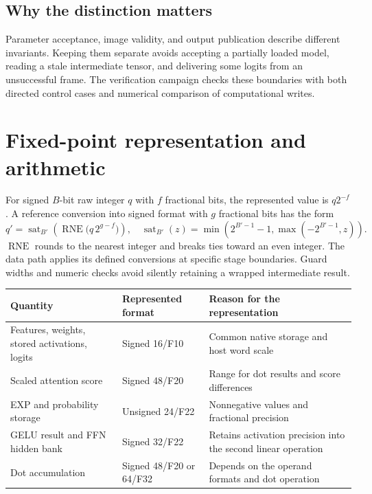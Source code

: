 \subsection{Why the distinction matters}
Parameter acceptance, image validity, and output publication describe different invariants. Keeping them separate avoids accepting a partially loaded model, reading a stale intermediate tensor, and delivering some logits from an unsuccessful frame. The verification campaign checks these boundaries with both directed control cases and numerical comparison of computational writes.
\clearpage

\section{Fixed-point representation and arithmetic}
For signed \(B\)-bit raw integer \(q\) with \(f\) fractional bits, the represented value is \(q2^{-f}\). A reference conversion into signed format with \(g\) fractional bits has the form
\[
 q'=\operatorname{sat}_{B'}\!
 \left(\operatorname{RNE}\bigl(q\,2^{g-f}\bigr)\right),
\quad
\operatorname{sat}_{B'}(z)=\min(2^{B'-1}-1,\max(-2^{B'-1},z)).
\]
\(\operatorname{RNE}\) rounds to the nearest integer and breaks ties toward an even integer. The data path applies its defined conversions at specific stage boundaries. Guard widths and numeric checks avoid silently retaining a wrapped intermediate result.

{\smalltbl
\begin{tabularx}{\linewidth}{@{}P{48mm}P{34mm}Y@{}}
\toprule
Quantity & Represented format & Reason for the representation\\ \midrule
Features, weights, stored activations, logits & Signed 16/F10 & Common native storage and host word scale\\
Scaled attention score & Signed 48/F20 & Range for dot results and score differences\\
EXP and probability storage & Unsigned 24/F22 & Nonnegative values and fractional precision\\
GELU result and FFN hidden bank & Signed 32/F22 & Retains activation precision into the second linear operation\\
Dot accumulation & Signed 48/F20 or 64/F32 & Depends on the operand formats and dot operation\\
\bottomrule
\end{tabularx}}

